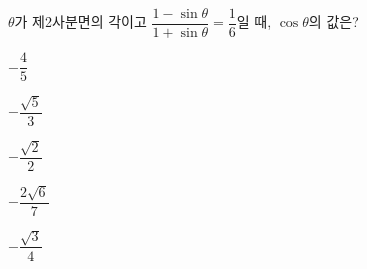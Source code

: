 $\theta$가 제2사분면의 각이고 $\dfrac{1-\sin\theta}{1+\sin\theta}=\dfrac{1}{6}$일 때, $\cos\theta$의 값은?
\begin{choices32}{\rule[-3ex]{0pt}{8ex}$-\dfrac{4}{5}$}{\rule[-3ex]{0pt}{8ex}$-\dfrac{\sqrt{5}}{3}$}{\rule[-3ex]{0pt}{8ex}$-\dfrac{\sqrt{2}}{2}$}{\rule[-3ex]{0pt}{8ex}$-\dfrac{2\sqrt{6}}{7}$}{\rule[-3ex]{0pt}{8ex}$-\dfrac{\sqrt{3}}{4}$}\end{choices32}

